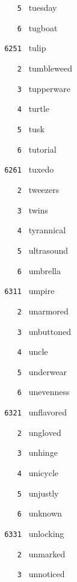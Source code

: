 \documentclass[11pt]{article}
\begin{document}
\begin{multicols}{6}
\noindent \texttt{ \ \ \ 5 } tuesday  \par
\noindent \texttt{ \ \ \ 6 } tugboat  \par
\vspace{3mm}
\noindent \texttt{ 6251 } tulip  \par
\noindent \texttt{ \ \ \ 2 } tumbleweed  \par
\noindent \texttt{ \ \ \ 3 } tupperware  \par
\noindent \texttt{ \ \ \ 4 } turtle  \par
\noindent \texttt{ \ \ \ 5 } tusk  \par
\noindent \texttt{ \ \ \ 6 } tutorial  \par
\vspace{3mm}
\noindent \texttt{ 6261 } tuxedo  \par
\noindent \texttt{ \ \ \ 2 } tweezers  \par
\noindent \texttt{ \ \ \ 3 } twins  \par
\noindent \texttt{ \ \ \ 4 } tyrannical  \par
\noindent \texttt{ \ \ \ 5 } ultrasound  \par
\noindent \texttt{ \ \ \ 6 } umbrella  \par
\noindent \texttt{ 6311 } umpire  \par
\noindent \texttt{ \ \ \ 2 } unarmored  \par
\noindent \texttt{ \ \ \ 3 } unbuttoned  \par
\noindent \texttt{ \ \ \ 4 } uncle  \par
\noindent \texttt{ \ \ \ 5 } underwear  \par
\noindent \texttt{ \ \ \ 6 } unevenness  \par
\vspace{3mm}
\noindent \texttt{ 6321 } unflavored  \par
\noindent \texttt{ \ \ \ 2 } ungloved  \par
\noindent \texttt{ \ \ \ 3 } unhinge  \par
\noindent \texttt{ \ \ \ 4 } unicycle  \par
\noindent \texttt{ \ \ \ 5 } unjustly  \par
\noindent \texttt{ \ \ \ 6 } unknown  \par
\vspace{3mm}
\noindent \texttt{ 6331 } unlocking  \par
\noindent \texttt{ \ \ \ 2 } unmarked  \par
\noindent \texttt{ \ \ \ 3 } unnoticed  \par

\end{multicols}
\end{document}
